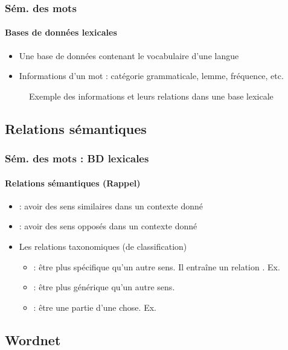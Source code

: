\documentclass[xcolor=table]{beamer}
\begin{document}
\begin{frame}
	\frametitle{Sém. des mots}
	\framesubtitle{Bases de données lexicales}
	
	\begin{itemize}
		\item Une base de données contenant le vocabulaire d'une langue
		\item Informations d'un mot : catégorie grammaticale, lemme, fréquence, etc.
	\end{itemize}

	\begin{figure}
		\centering 
		\caption{Exemple des informations et leurs relations dans une base lexicale \cite{2019-white-al}}
	\end{figure}
	
\end{frame}

\subsection{Relations sémantiques}

\begin{frame}
	\frametitle{Sém. des mots : BD lexicales}
	\framesubtitle{Relations sémantiques (Rappel)}
	
	\begin{itemize}
		\item {} : avoir des sens similaires dans un contexte donné
		\item {} : avoir des sens opposés dans un contexte donné
		\item Les relations taxonomiques (de classification)
		\begin{itemize}
			\item {} : être plus spécifique qu'un autre sens. Il entraîne un relation . Ex.  
			\item {} : être plus générique qu'un autre sens. 
			\item {} : être une partie d'une chose. Ex. 
		\end{itemize}
	\end{itemize}
	
\end{frame}

\subsection{Wordnet}
\end{document}
